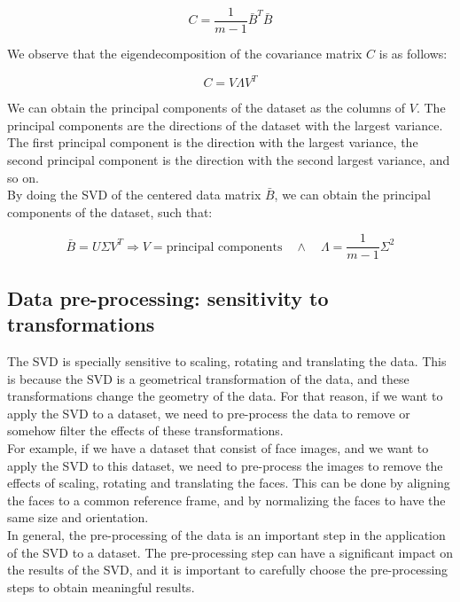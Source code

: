 \begin{equation}
    C = \frac{1}{m - 1} \bar{B}^T \bar{B}
\end{equation}

We observe that the eigendecomposition of the covariance matrix $C$ is as follows:

\begin{equation}
    C = V \Lambda V^T
\end{equation}

We can obtain the principal components of the dataset as the columns of $V$. The principal components are the directions of the dataset
with the largest variance. The first principal component is the direction with the largest variance, the second principal component is
the direction with the second largest variance, and so on.\\

By doing the SVD of the centered data matrix $\bar{B}$, we can obtain the principal components of the dataset, such that:

\begin{equation}
    \bar{B} = U \Sigma V^T
    \Rightarrow V = \text{principal components} \quad \wedge \quad \Lambda = \frac{1}{m - 1} \Sigma^2 
\end{equation}

\subsection{Data pre-processing: sensitivity to transformations}

The SVD is specially sensitive to scaling, rotating and translating the data. This is because the SVD
is a geometrical transformation of the data, and these transformations change the geometry of the data.
For that reason, if we want to apply the SVD to a dataset, we need to pre-process the data to remove or somehow
filter the effects of these transformations.\\

For example, if we have a dataset that consist of face images, and we want to apply the SVD to this dataset,
we need to pre-process the images to remove the effects of scaling, rotating and translating the faces. This can
be done by aligning the faces to a common reference frame, and by normalizing the faces to have the same size and
orientation.\\

In general, the pre-processing of the data is an important step in the application of the SVD to a dataset. The
pre-processing step can have a significant impact on the results of the SVD, and it is important to carefully
choose the pre-processing steps to obtain meaningful results.

